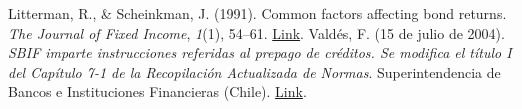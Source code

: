 \begin{thebibliography}{1}

Litterman, R., \& Scheinkman, J. (1991).
\newblock Common factors affecting bond returns.
\newblock \emph{The Journal of Fixed Income}, \emph{1}(1), 54--61.
\newblock \href{https://jfi.pm-research.com/content/1/1/54}{Link}.
Valdés, F. (15 de julio de 2004).
\emph{SBIF imparte instrucciones referidas al prepago de créditos.
Se modifica el título I del Capítulo 7{-}1 de la Recopilación Actualizada de Normas}.
Superintendencia de Bancos e Instituciones Financieras (Chile). \href{https://sbif.cl/sbifweb/servlet/Noticia?indice=2.1&idContenido=1870#:~:text=Las%20nuevas%20disposiciones%20legales%20contenidas,trat%C3%A1ndose%20de%20operaciones%20no%20reajustables}{Link}.

\end{thebibliography}
